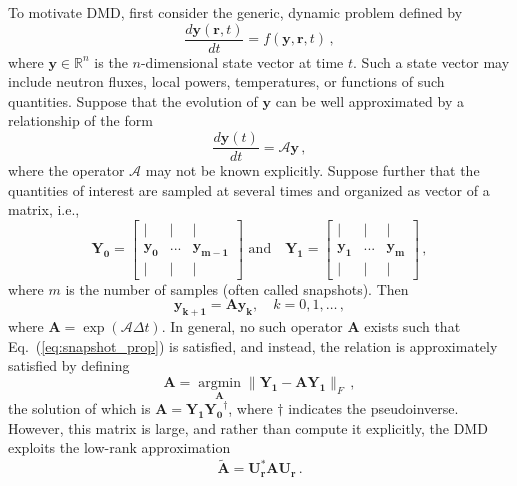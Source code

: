 \documentclass{anstrans}
\renewcommand{\vec}[1]{\bm{#1}} %
\DeclareMathOperator*{\argmin}{argmin}
\begin{document}
To motivate DMD, first consider the generic, dynamic problem defined by
\begin{equation}
  \frac{d{\vec{y} }(\vec{r},t)}{dt}=f(\vec{y},\vec{r},t) \, ,
\end{equation}
where ${\vec{y}} \in \mathbb{R}^{n}$ is the $n$-dimensional state vector at time $t$.  
Such a state vector may include neutron fluxes, local powers, temperatures, or functions of such quantities.
Suppose that the evolution of $\vec{y}$ can be well approximated by a relationship of the form  
\begin{equation}
 \frac{d{\vec{y}}(t)}{dt}=\mathcal{A}\vec{y} \, ,
\end{equation}
where the operator $\mathcal{A}$ may not be known explicitly. 
Suppose further that the quantities of interest are sampled at several times and organized as vector of a matrix, i.e.,
\begin{equation}
\mathbf{Y_0}=\left[\begin{array}{ccc}
| & |   & | \\
{\vec{y_0}} &   ... & {\vec{y_{m-1}}} \\ 
| & | &  | 
\end{array} \right] 
 \,\, \text{and} \quad
{\mathbf{Y_1}}=\left[\begin{array}{ccc}
| & |  & | \\ 
{\vec{y_1}} & ... & {\vec{y_{m}}} \\ 
| & |  & |
\end{array} \right] \, ,
\end{equation}
where $m$ is the number of samples (often called snapshots).  
Then
\begin{equation}
  \mathbf{y_{k+1}}=\mathbf{A}\mathbf{y_{k}}, \quad k = 0, 1, \ldots \, ,
\label{eq:snapshot_prop}
\end{equation}
where $\mathbf{A}=\exp(\mathcal{A}\Delta t)$.  
In general, no such operator $\mathbf{A}$ exists such that Eq.~(\ref{eq:snapshot_prop}) is satisfied, and instead, the relation is approximately satisfied by defining
\begin{equation}
\label{eq:AOpt}
    \mathbf{A}=\argmin\limits_{\mathbf{A}}\|\mathbf{Y_{1}} -\mathbf{AY_{1}}\|_F \, ,
\end{equation}
the solution of which is $\mathbf{A}=\mathbf{Y_1}\mathbf{{{Y}_{0}}^{\dagger}}$, where $\dagger$ indicates the pseudoinverse.
However, this matrix is large, and rather than compute it explicitly, the DMD exploits the low-rank approximation
\begin{equation}
\mathbf{\tilde{A}} = \mathbf{U_r^{*}AU_r} \, .
\end{equation}
\end{document}
